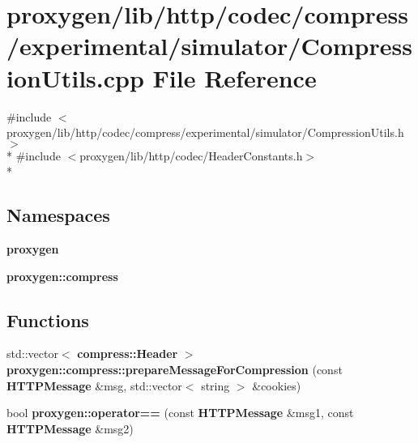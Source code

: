 \section{proxygen/lib/http/codec/compress/experimental/simulator/\+Compression\+Utils.cpp File Reference}
\label{CompressionUtils_8cpp}
{\ttfamily \#include $<$proxygen/lib/http/codec/compress/experimental/simulator/\+Compression\+Utils.\+h$>$}\\*
{\ttfamily \#include $<$proxygen/lib/http/codec/\+Header\+Constants.\+h$>$}\\*
\subsection*{Namespaces}
\begin{DoxyCompactItemize}
\item 
 {\bf proxygen}
\item 
 {\bf proxygen\+::compress}
\end{DoxyCompactItemize}
\subsection*{Functions}
\begin{DoxyCompactItemize}
\item 
std\+::vector$<$ {\bf compress\+::\+Header} $>$ {\bf proxygen\+::compress\+::prepare\+Message\+For\+Compression} (const {\bf H\+T\+T\+P\+Message} \&msg, std\+::vector$<$ string $>$ \&cookies)
\item 
bool {\bf proxygen\+::operator==} (const {\bf H\+T\+T\+P\+Message} \&msg1, const {\bf H\+T\+T\+P\+Message} \&msg2)
\end{DoxyCompactItemize}
